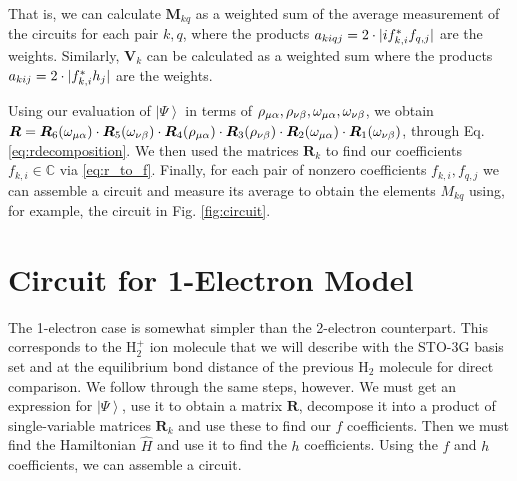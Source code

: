 \documentclass{aux/ttuthes2007}
\newcommand{\ket}[1]{\ensuremath{\left|#1\right\rangle}}
\newcommand{\ind}[1]{{\uo #1 \oo #1}}
\newcommand{\uo}[1]{
		\IfEqCase{#1}{
			{0}{\mu}
			{1}{\nu}
			{2}{\xi}
		}[\PackageError{uo}{Undefined option to uo: #1}{}]
}
\newcommand{\oo}[1]{
		\IfEqCase{#1}{
			{0}{\alpha}
			{1}{\beta}
			{2}{\gamma}
		}[\PackageError{unocorb}{Undefined option to unuo: #1}{}]
}
\DeclarePairedDelimiter\abs{\lvert}{\rvert}
\begin{document}
%
That is, we can calculate $\bm M_{kq}$ as a weighted sum of the average measurement of the circuits for each pair $k, q$, where the products $a_{kiqj} = 2\cdot \abs{if_{k, i}^*f_{q, j}}$ are the weights.
Similarly, $\bm V_k$ can be calculated as a weighted sum where the products $a_{kij} = 2\cdot \abs{f_{k, i}^*h_j}$ are the weights.

Using our evaluation of $\ket\Psi$ in terms of $\rho_\ind 0, \rho_\ind 1, \omega_\ind 0, \omega_\ind 1$, we obtain 
$\bm R = 
\bm R_6(\omega_\ind 0) \cdot
\bm R_5(\omega_\ind 1) \cdot
\bm R_4(\rho_\ind 0) \cdot
\bm R_3(\rho_\ind 1) \cdot
\bm R_2(\omega_\ind 0) \cdot
\bm R_1(\omega_\ind 1)
$, through Eq. \ref{eq:rdecomposition}.
%
We then used the matrices $\bm R_k$ to find our coefficients $f_{k, i} \in \mathbb{C}$ via \ref{eq:r_to_f}. Finally, for each pair of nonzero coefficients $f_{k, i}, f_{q, j}$ we can assemble a circuit and measure its average to obtain the elements $M_{kq}$ using, for example, the circuit in Fig. \ref{fig:circuit}.


\section {\textbf{Circuit for 1-Electron Model}}

The 1-electron case is somewhat simpler than the 2-electron counterpart.
This corresponds to the $\text{H}_2^+$ ion molecule that we will describe with the STO-3G basis set and at the equilibrium bond distance of the previous $\text{H}_2$ molecule for direct comparison.
We follow through the same steps, however. We must get an expression for $\ket \Psi$, use it to obtain a matrix $\bm R$, decompose it into a product of single-variable matrices $\bm R_k$ and use these to find our $f$ coefficients. Then we must find the Hamiltonian $\hat H$ and use it to find the $h$ coefficients. Using the $f$ and $h$ coefficients, we can assemble a circuit.
%
\end{document}
